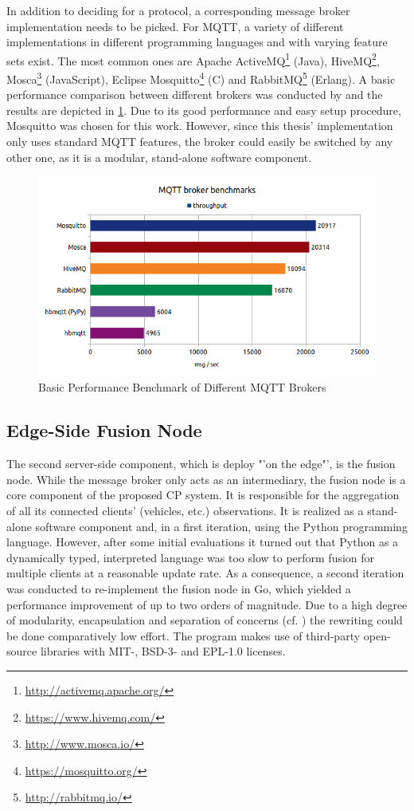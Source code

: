 In addition to deciding for a protocol, a corresponding message broker implementation needs to be picked. For MQTT, a variety of different implementations in different programming languages and with varying feature sets exist. The most common ones are Apache ActiveMQ\footnote{\url{http://activemq.apache.org/}} (Java), HiveMQ\footnote{\url{https://www.hivemq.com/}}, Mosca\footnote{\url{http://www.mosca.io/}} (JavaScript), Eclipse Mosquitto\footnote{\url{https://mosquitto.org/}} (C) and RabbitMQ\footnote{\url{http://rabbitmq.io/}} (Erlang). A basic performance comparison between different brokers was conducted by \cite{Mutsch2019} and the results are depicted in \cref{fig:mqtt_benchmarks}. Due to its good performance and easy setup procedure, Mosquitto was chosen for this work. However, since this thesis' implementation only uses standard MQTT features, the broker could easily be switched by any other one, as it is a modular, stand-alone software component.

\begin{figure}
	\centering
	\includegraphics[width=0.9\linewidth]{98_images/mqtt_bench_2}
	\caption{Basic Performance Benchmark of Different MQTT Brokers}
	\label{fig:mqtt_benchmarks}
\end{figure}

\subsection{Edge-Side Fusion Node}
\label{subsec:implementation:edge_side_fusion_node}
The second server-side component, which is deploy "'on the edge"', is the fusion node. While the message broker only acts as an intermediary, the fusion node is a core component of the proposed CP system. It is responsible for the aggregation of all its connected clients' (vehicles, etc.) observations. It is realized as a stand-alone software component and, in a first iteration, using the Python programming language. However, after some initial evaluations it turned out that Python as a dynamically typed, interpreted language was too slow to perform fusion for multiple clients at a reasonable update rate. As a consequence, a second iteration was conducted to re-implement the fusion node in Go, which yielded a performance improvement of up to two orders of magnitude. Due to a high degree of modularity, encapsulation and separation of concerns (cf. \cite{Martin2017}) the rewriting could be done comparatively low effort. The program makes use of third-party open-source libraries  with MIT-, BSD-3- and EPL-1.0 licenses.
\par
\bigskip

